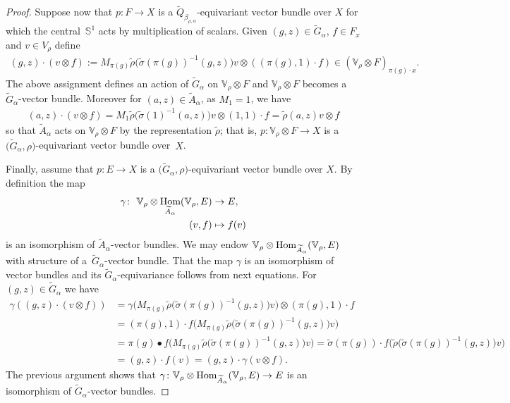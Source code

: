 \documentclass[10pt,a4paper]{amsart}
\def\S{\mathbb{S}}
\def\V{\mathbb{V}}
\DeclareMathOperator{\Hom}{\textup{Hom}}
\theoremstyle{definition}
\numberwithin{equation}{section}
\begin{document}
\begin{proof}
Suppose now that $p \colon F \rightarrow X$ is a
$\widetilde{Q}_{\beta_{\rho,\alpha}}$-equivariant vector bundle over $X$
for which the central~$\S^{1}$ acts by multiplication of
scalars. Given $(g,z)\in \widetilde{G}_{\alpha}$, $f\in F_{x}$ and $v\in
V_{\rho}$ define
\begin{gather}
(g,z)\cdot (v\otimes f):=M_{\pi(g)}\tilde{\rho}\big(\tilde{\sigma}(\pi(g))^{-1}(g,z)\big)v\otimes
((\pi(g),1)\cdot f)\in (\V_{\rho}\otimes F)_{\pi(g)\cdot x}.
\label{ecu:ac2}
\end{gather}
The above assignment defines an action of $\widetilde{G}_{\alpha}$
on $\V_{\rho}\otimes F$ and $\V_{\rho}\otimes F$
becomes a $\widetilde{G}_{\alpha}$-vector bundle.
Moreover for $(a,z)\in \widetilde{A}_{\alpha}$, as $M_{1}=1$, we have
\begin{gather*}
(a,z)\cdot (v\otimes
f)=M_{1}\tilde{\rho}\big(\tilde{\sigma}(1)^{-1}(a,z)\big)v\otimes
(1,1)\cdot f=\tilde{\rho}(a,z)v\otimes f
\end{gather*}
so that $\widetilde{A}_{\alpha}$ acts on $\V_{\rho}\otimes
F$ by the representation $\tilde{\rho}$; that is,
$p\colon \V_{\rho}\otimes F\rightarrow X$ is a
$\big(\widetilde{G}_{\alpha},\rho\big)$-equivariant vector bundle
over~$X$.
	
Finally, assume that $p\colon E \rightarrow X$ is a
$\big(\widetilde{G}_{\alpha},\rho\big)$-equivariant vector bundle over $X$.
By definition the map
\begin{align*}
\gamma\colon \ \V_{\rho}\otimes
\Hom_{\widetilde{A}_{\alpha}}(\V_{\rho},E)&\rightarrow E,
\\
(v,f)&\mapsto f(v)
\end{align*}
is an isomorphism of $\widetilde{A}_{\alpha}$-vector bundles. We may endow
$\V_{\rho}\otimes\Hom_{\widetilde{A}_{\alpha}}(\V_{\rho},E)$
with structure of a~$\widetilde{G}_{\alpha}$-vector bundle. That the map
$\gamma$ is an isomorphism of vector bundles and its
$\widetilde{G}_{\alpha}$-equivariance follows from next equations.
For $(g,z)\in \widetilde{G}_{\alpha}$ we have
\begin{align*}
\gamma((g,z)\cdot(v\otimes
f))&=\gamma\big(M_{\pi(g)}\tilde{\rho}\big(\tilde{\sigma}(\pi(g))^{-1}(g,z)\big)v\big)\otimes
(\pi(g),1)\cdot f\\
&=(\pi(g),1)\cdot f
\big(M_{\pi(g)}\tilde{\rho}\big(\tilde{\sigma}(\pi(g))^{-1}(g,z)\big)v\big)\\
&=\pi(g)\bullet\!
f\big(M_{\pi(g)}\tilde{\rho}\big(\tilde{\sigma}(\pi(g))^{-1}(g,z)\big)v\big)
\!=\tilde{\sigma}(\pi(g))\!\cdot
f\big(\tilde{\rho}\big(\tilde{\sigma}(\pi(g))^{-1}(g,z)\big)v\big)\\
	&=(g,z)\cdot f(v)=(g,z)\cdot\gamma(v\otimes f).
\end{align*}
The previous argument shows that $\gamma\colon
\V_{\rho}\otimes
\Hom_{\widetilde{A}_{\alpha}}(\V_{\rho},E)\rightarrow
E$ is an isomorphism of $\widetilde{G}_{\alpha}$-vector bundles.
	

\end{proof}
\end{document}
